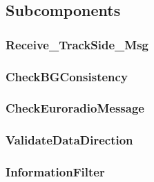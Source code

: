 \subsection{Subcomponents}\label{s:receivetrackdata_subcomponents}

\subsubsection{Receive\_TrackSide\_Msg}


\subsubsection{CheckBGConsistency}


\subsubsection{CheckEuroradioMessage}


\subsubsection{ValidateDataDirection}


\subsubsection{InformationFilter}

